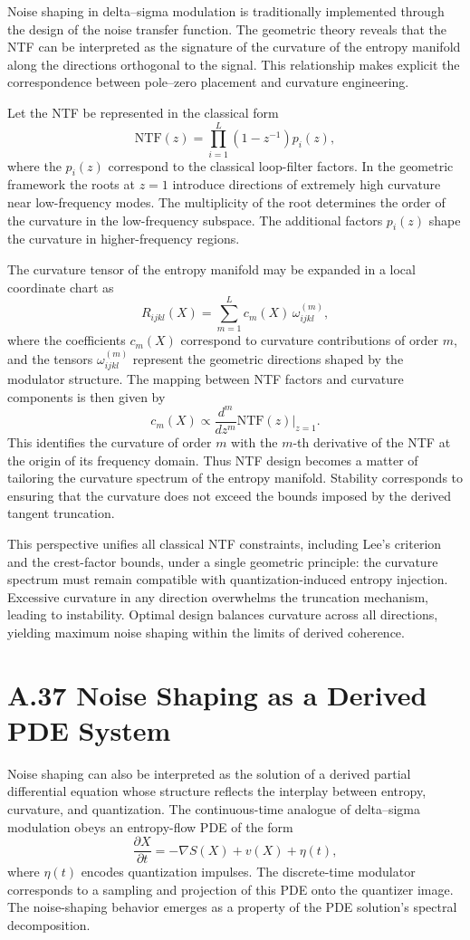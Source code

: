 Noise shaping in delta–sigma modulation is traditionally implemented through the design of the noise transfer function. The geometric theory reveals that the NTF can be interpreted as the signature of the curvature of the entropy manifold along the directions orthogonal to the signal. This relationship makes explicit the correspondence between pole–zero placement and curvature engineering.

Let the NTF be represented in the classical form
\[
\mathrm{NTF}(z) = \prod_{i=1}^L (1 - z^{-1}) p_i(z),
\]
where the \(p_i(z)\) correspond to the classical loop-filter factors. In the geometric framework the roots at \(z = 1\) introduce directions of extremely high curvature near low-frequency modes. The multiplicity of the root determines the order of the curvature in the low-frequency subspace. The additional factors \(p_i(z)\) shape the curvature in higher-frequency regions.

The curvature tensor of the entropy manifold may be expanded in a local coordinate chart as
\[
R_{ijkl}(X) = \sum_{m=1}^L c_m(X) \, \omega_{ijkl}^{(m)},
\]
where the coefficients \(c_m(X)\) correspond to curvature contributions of order \(m\), and the tensors \(\omega_{ijkl}^{(m)}\) represent the geometric directions shaped by the modulator structure. The mapping between NTF factors and curvature components is then given by
\[
c_m(X) \propto \frac{d^m}{dz^m} \mathrm{NTF}(z)\bigg|_{z=1}.
\]
This identifies the curvature of order \(m\) with the \(m\)-th derivative of the NTF at the origin of its frequency domain. Thus NTF design becomes a matter of tailoring the curvature spectrum of the entropy manifold. Stability corresponds to ensuring that the curvature does not exceed the bounds imposed by the derived tangent truncation.

This perspective unifies all classical NTF constraints, including Lee’s criterion and the crest-factor bounds, under a single geometric principle: the curvature spectrum must remain compatible with quantization-induced entropy injection. Excessive curvature in any direction overwhelms the truncation mechanism, leading to instability. Optimal design balances curvature across all directions, yielding maximum noise shaping within the limits of derived coherence.

\section{A.37 Noise Shaping as a Derived PDE System}

Noise shaping can also be interpreted as the solution of a derived partial differential equation whose structure reflects the interplay between entropy, curvature, and quantization. The continuous-time analogue of delta–sigma modulation obeys an entropy-flow PDE of the form
\[
\frac{\partial X}{\partial t} = -\nabla S(X) + v(X) + \eta(t),
\]
where \(\eta(t)\) encodes quantization impulses. The discrete-time modulator corresponds to a sampling and projection of this PDE onto the quantizer image. The noise-shaping behavior emerges as a property of the PDE solution’s spectral decomposition.


